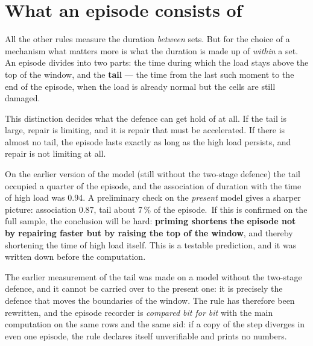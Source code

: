 \section{What an episode consists of}\label{sec:tail}
All the other rules measure the duration \emph{between} sets. But for the choice of a mechanism what matters more is what the duration is made up of \emph{within} a set. An episode divides into two parts: the time during which the load stays above the top of the window, and the \textbf{tail} --- the time from the last such moment to the end of the episode, when the load is already normal but the cells are still damaged.

This distinction decides what the defence can get hold of at all. If the tail is large, repair is limiting, and it is repair that must be accelerated. If there is almost no tail, the episode lasts exactly as long as the high load persists, and repair is not limiting at all.

On the earlier version of the model (still without the two-stage defence) the tail occupied a quarter of the episode, and the association of duration with the time of high load was 0.94. A preliminary check on the \emph{present} model gives a sharper picture: association 0.87, tail about 7\,\% of the episode.\tD\ If this is confirmed on the full sample, the conclusion will be hard: \textbf{priming shortens the episode not by repairing faster but by raising the top of the window}, and thereby shortening the time of high load itself. This is a testable prediction, and it was written down before the computation.

\begin{note}
The earlier measurement of the tail was made on a model without the two-stage defence, and it cannot be carried over to the present one: it is precisely the defence that moves the boundaries of the window. The rule has therefore been rewritten, and the episode recorder is \emph{compared bit for bit} with the main computation on the same rows and the same sid: if a copy of the step diverges in even one episode, the rule declares itself unverifiable and prints no numbers.
\end{note}
